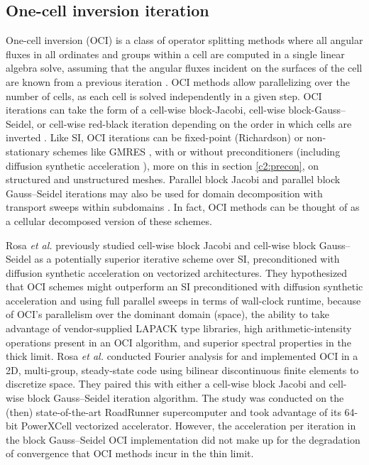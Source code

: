 \subsection{One-cell inversion iteration}
\label{c2:oci}

One-cell inversion (OCI) is a class of operator splitting methods where all angular fluxes in all ordinates and groups within a cell are computed in a single linear algebra solve, assuming that the angular fluxes incident on the surfaces of the cell are known from a previous iteration \cite{kang2000oci}.
OCI methods allow parallelizing over the number of cells, as each cell is solved independently in a given step.
OCI iterations can take the form of a cell-wise block-Jacobi, cell-wise block-Gauss--Seidel, or cell-wise red-black iteration depending on the order in which cells are inverted \cite{man1994parallel}.
Like SI, OCI iterations can be fixed-point (Richardson) or non-stationary schemes like GMRES \cite{kylov2004warsa}, with or without preconditioners (including diffusion synthetic acceleration \cite{kang2000oci}), more on this in section \ref{c2:precon}, on structured and unstructured meshes.
Parallel block Jacobi and parallel block Gauss--Seidel iterations may also be used for domain decomposition with transport sweeps within subdomains \cite{qiao_improved_2021}.
In fact, OCI methods can be thought of as a cellular decomposed version of these schemes.

Rosa \textit{et al.} \cite{rosa_cellwise_2013} previously studied cell-wise block Jacobi and cell-wise block Gauss--Seidel as a potentially superior iterative scheme over SI, preconditioned with diffusion synthetic acceleration on vectorized architectures.
They hypothesized that OCI schemes might outperform an SI preconditioned with diffusion synthetic acceleration and using full parallel sweeps in terms of wall-clock runtime, because of OCI's parallelism over the dominant domain (space), the ability to take advantage of vendor-supplied LAPACK type libraries, high arithmetic-intensity operations present in an OCI algorithm, and superior spectral properties in the thick limit.
Rosa \textit{et al.} conducted Fourier analysis for and implemented OCI in a 2D, multi-group, steady-state code using bilinear discontinuous finite elements to discretize space.
They paired this with either a cell-wise block Jacobi and cell-wise block Gauss--Seidel iteration algorithm.
The study was conducted on the (then) state-of-the-art RoadRunner supercomputer and took advantage of its 64-bit PowerXCell vectorized accelerator.
However, the acceleration per iteration in the block Gauss--Seidel OCI implementation did not make up for the degradation of convergence that OCI methods incur in the thin limit.

